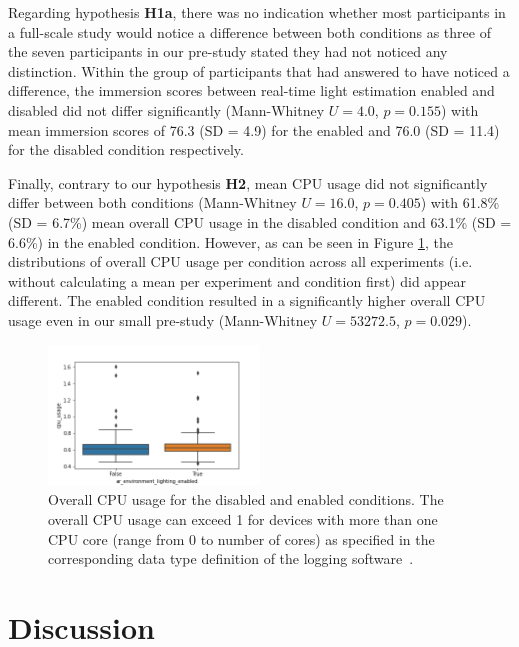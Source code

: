 \documentclass[12pt,twoside,english]{article}
\begin{document}
Regarding hypothesis \textbf{H1a}, there was no indication whether most participants in a full-scale study would notice a difference between both conditions as three of the seven participants in our pre-study stated they had not noticed any distinction.
Within the group of participants that had answered to have noticed a difference, the immersion scores between real-time light estimation enabled and disabled did not differ significantly (Mann-Whitney $ U = 4.0 $, $ p = 0.155 $) with mean immersion scores of 76.3 (SD = 4.9) for the enabled and 76.0 (SD = 11.4) for the disabled condition respectively.

Finally, contrary to our hypothesis \textbf{H2}, mean \gls{CPU} usage did not significantly differ between both conditions (Mann-Whitney $ U = 16.0 $, $ p = 0.405 $) with 61.8\% (SD = 6.7\%) mean overall \gls{CPU} usage in the disabled condition and 63.1\% (SD = 6.6\%) in the enabled condition.
However, as can be seen in Figure \ref{fig:cpu_raw_plot}, the distributions of overall \gls{CPU} usage per condition across all experiments (i.e. without calculating a mean per experiment and condition first) did appear different.
The enabled condition resulted in a significantly higher overall \gls{CPU} usage even in our small pre-study (Mann-Whitney $ U = 53272.5 $, $ p = 0.029 $).

\begin{figure}[h]
    \centering
    \includegraphics[width=0.5\textwidth]{imgs/cpu_raw_plot}
    \caption{Overall \gls{CPU} usage for the disabled and enabled conditions. The overall \gls{CPU} usage can exceed 1 for devices with more than one \gls{CPU} core (range from 0 to number of cores) as specified in the corresponding data type definition of the logging software~\cite{apple_system_2020}.}
    \label{fig:cpu_raw_plot}
\end{figure}


\section{Discussion}
\label{sect:discussion}
\end{document}
